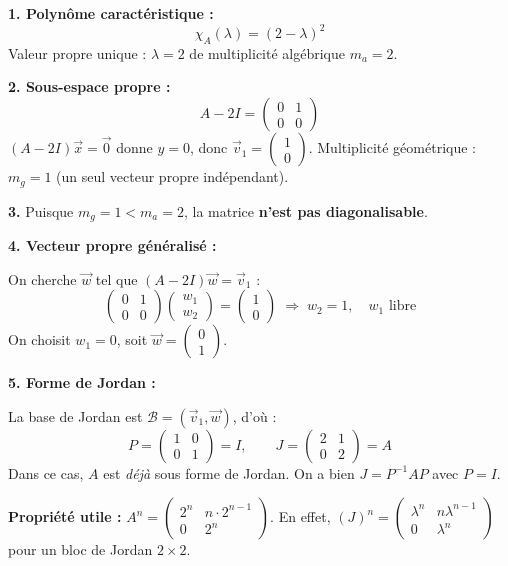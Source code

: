 \documentclass[12pt,a4paper]{article}
\begin{document}
\begin{boitecorrige}
\textbf{1. Polynôme caractéristique :}
\[
\chi_A(\lambda) = (2-\lambda)^2
\]
Valeur propre unique : $\lambda = 2$ de multiplicité algébrique $m_a = 2$.

\textbf{2. Sous-espace propre :}
\[
A - 2I = \begin{pmatrix}0&1\\0&0\end{pmatrix}
\]
$(A-2I)\vec{x}=\vec{0}$ donne $y=0$, donc $\vec{v}_1 = \begin{pmatrix}1\\0\end{pmatrix}$.
Multiplicité géométrique : $m_g = 1$ (un seul vecteur propre indépendant).

\textbf{3.} Puisque $m_g = 1 < m_a = 2$, la matrice \textbf{n'est pas diagonalisable}.

\textbf{4. Vecteur propre généralisé :}

On cherche $\vec{w}$ tel que $(A-2I)\vec{w} = \vec{v}_1$ :
\[
\begin{pmatrix}0&1\\0&0\end{pmatrix}\begin{pmatrix}w_1\\w_2\end{pmatrix} = \begin{pmatrix}1\\0\end{pmatrix} \;\Rightarrow\; w_2 = 1, \quad w_1 \text{ libre}
\]
On choisit $w_1 = 0$, soit $\vec{w} = \begin{pmatrix}0\\1\end{pmatrix}$.

\textbf{5. Forme de Jordan :}

La base de Jordan est $\mathcal{B} = (\vec{v}_1, \vec{w})$, d'où :
\[
P = \begin{pmatrix}1 & 0 \\ 0 & 1\end{pmatrix} = I, \qquad J = \begin{pmatrix}2 & 1 \\ 0 & 2\end{pmatrix} = A
\]
Dans ce cas, $A$ est \emph{déjà} sous forme de Jordan. On a bien $J = P^{-1}AP$ avec $P=I$.

\textbf{Propriété utile :} $A^n = \begin{pmatrix}2^n & n\cdot2^{n-1}\\0&2^n\end{pmatrix}$. En effet, $(J)^n = \begin{pmatrix}\lambda^n & n\lambda^{n-1}\\0&\lambda^n\end{pmatrix}$ pour un bloc de Jordan $2\times2$.
\end{boitecorrige}
\end{document}
